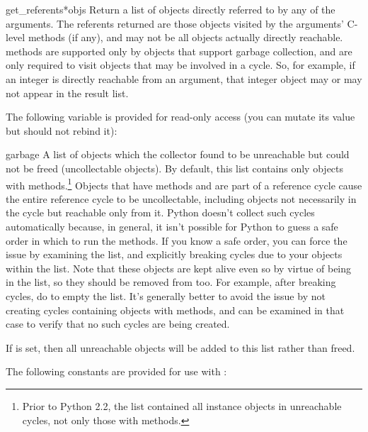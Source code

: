 \begin{funcdesc}{get_referents}{*objs}
Return a list of objects directly referred to by any of the arguments.
The referents returned are those objects visited by the arguments'
C-level  methods (if any), and may not be all
objects actually directly reachable.   methods
are supported only by objects that support garbage collection, and are
only required to visit objects that may be involved in a cycle.  So,
for example, if an integer is directly reachable from an argument, that
integer object may or may not appear in the result list.

\end{funcdesc}

The following variable is provided for read-only access (you can
mutate its value but should not rebind it):

\begin{datadesc}{garbage}
A list of objects which the collector found to be unreachable
but could not be freed (uncollectable objects).  By default, this list
contains only objects with  methods.\footnote{Prior to
  Python 2.2, the list contained all instance objects in unreachable
  cycles,  not only those with  methods.}
Objects that have
 methods and are part of a reference cycle cause
the entire reference cycle to be uncollectable, including objects
not necessarily in the cycle but reachable only from it.  Python doesn't
collect such cycles automatically because, in general, it isn't possible
for Python to guess a safe order in which to run the 
methods.  If you know a safe order, you can force the issue by examining
the  list, and explicitly breaking cycles due to your
objects within the list.  Note that these objects are kept alive even
so by virtue of being in the  list, so they should be
removed from  too.  For example, after breaking cycles, do
 to empty the list.  It's generally better
to avoid the issue by not creating cycles containing objects with
 methods, and  can be examined in that
case to verify that no such cycles are being created.

If  is set, then all unreachable objects will
be added to this list rather than freed.
\end{datadesc}


The following constants are provided for use with
:

